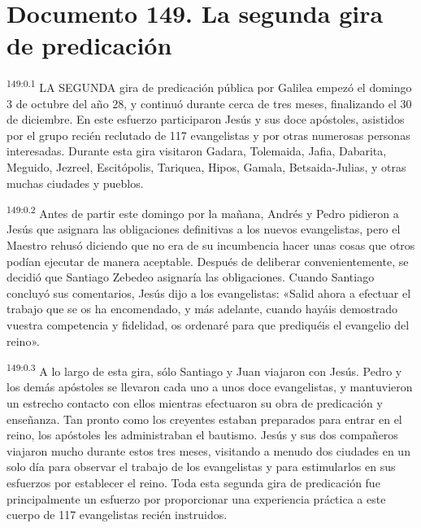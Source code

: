 \chapter{Documento 149. La segunda gira de predicación}
\par 
\textsuperscript{149:0.1} LA SEGUNDA gira de predicación pública por Galilea empezó el domingo 3 de octubre del año 28, y continuó durante cerca de tres meses, finalizando el 30 de diciembre. En este esfuerzo participaron Jesús y sus doce apóstoles, asistidos por el grupo recién reclutado de 117 evangelistas y por otras numerosas personas interesadas. Durante esta gira visitaron Gadara, Tolemaida, Jafia, Dabarita, Meguido, Jezreel, Escitópolis, Tariquea, Hipos, Gamala, Betsaida-Julias, y otras muchas ciudades y pueblos.

\par 
\textsuperscript{149:0.2} Antes de partir este domingo por la mañana, Andrés y Pedro pidieron a Jesús que asignara las obligaciones definitivas a los nuevos evangelistas, pero el Maestro rehusó diciendo que no era de su incumbencia hacer unas cosas que otros podían ejecutar de manera aceptable. Después de deliberar convenientemente, se decidió que Santiago Zebedeo asignaría las obligaciones. Cuando Santiago concluyó sus comentarios, Jesús dijo a los evangelistas: «Salid ahora a efectuar el trabajo que se os ha encomendado, y más adelante, cuando hayáis demostrado vuestra competencia y fidelidad, os ordenaré para que prediquéis el evangelio del reino».

\par 
\textsuperscript{149:0.3} A lo largo de esta gira, sólo Santiago y Juan viajaron con Jesús. Pedro y los demás apóstoles se llevaron cada uno a unos doce evangelistas, y mantuvieron un estrecho contacto con ellos mientras efectuaron su obra de predicación y enseñanza. Tan pronto como los creyentes estaban preparados para entrar en el reino, los apóstoles les administraban el bautismo. Jesús y sus dos compañeros viajaron mucho durante estos tres meses, visitando a menudo dos ciudades en un solo día para observar el trabajo de los evangelistas y para estimularlos en sus esfuerzos por establecer el reino. Toda esta segunda gira de predicación fue principalmente un esfuerzo por proporcionar una experiencia práctica a este cuerpo de 117 evangelistas recién instruidos.

